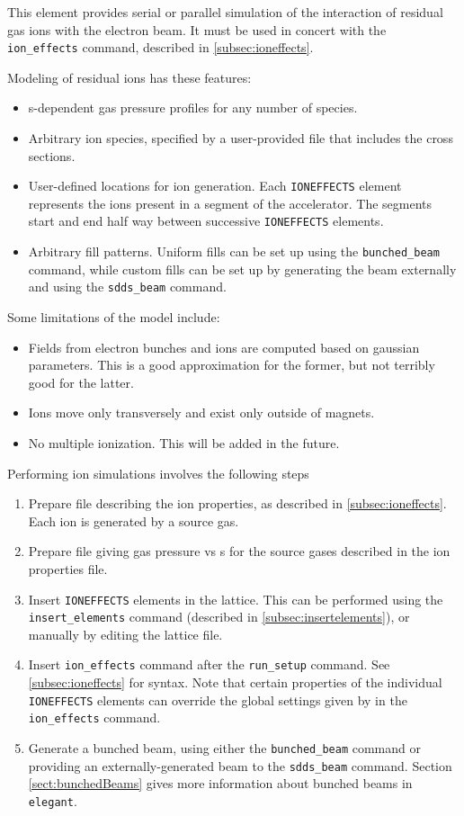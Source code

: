 This element provides serial or parallel simulation of the interaction of residual gas ions
with the electron beam.
It must be used in concert with the \verb|ion_effects| command, described in \ref{subsec:ioneffects}.

Modeling of residual ions has these features:
\begin{itemize}
\item s-dependent gas pressure profiles for any number of species.
\item Arbitrary ion species, specified by a user-provided file that includes the cross sections.
\item User-defined locations for ion generation. Each \verb|IONEFFECTS| element represents the
      ions present in a segment of the accelerator. The segments start and end half way between
      successive \verb|IONEFFECTS| elements.
\item Arbitrary fill patterns. Uniform fills can be set up using the \verb|bunched_beam| command,
      while custom fills can be set up by generating the beam externally and using the \verb|sdds_beam| command.
\end{itemize}

Some limitations of the model include:
\begin{itemize}
\item Fields from electron bunches and ions are computed based on gaussian parameters. 
      This is a good approximation for the former, but not terribly good for the latter.
\item Ions move only transversely and exist only outside of magnets.
\item No multiple ionization. This will be added in the future.
\end{itemize}

Performing ion simulations involves the following steps
\begin{enumerate}
\item Prepare file describing the ion properties, as described in \ref{subsec:ioneffects}.
  Each ion is generated by a source gas.
\item Prepare file giving gas pressure vs s for the source gases described in the ion 
  properties file.
\item Insert \verb|IONEFFECTS| elements in the lattice. This can be performed using the
  \verb|insert_elements| command (described in \ref{subsec:insertelements}), or
  manually by editing the lattice file.
\item Insert \verb|ion_effects| command after the \verb|run_setup| command. See
  \ref{subsec:ioneffects} for syntax.
  Note that certain properties of the individual \verb|IONEFFECTS| elements can override the
  global settings given by in the \verb|ion_effects| command.
\item Generate a bunched beam, using either the \verb|bunched_beam| command or providing
  an externally-generated beam to the \verb|sdds_beam| command. Section \ref{sect:bunchedBeams}
  gives more information about bunched beams in \verb|elegant|.
\end{enumerate}
